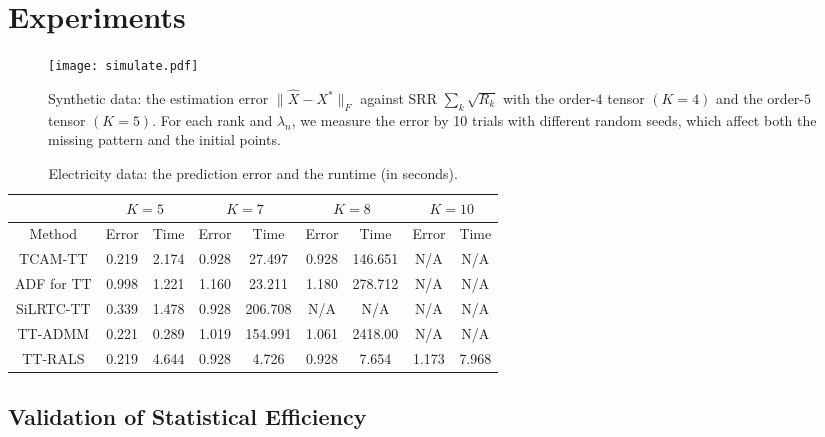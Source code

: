 \section{Experiments}
    \begin{figure}[htbp]
            \begin{center}
                \texttt{[image: simulate.pdf]}
            \end{center}
            \caption{Synthetic data: the estimation error
              $\|\hat{X} - X^*\|_F$ against SRR $\sum_k \sqrt{R_k}$
              with the order-$4$ tensor $(K=4)$ and the order-$5$
              tensor $(K=5)$. For each rank and $\lambda_n$, we
              measure the error by 10
              trials with different random seeds, which affect both
              the missing pattern and the initial
              points. \label{fig:validation}}
    \end{figure}

        \begin{table}
          \caption{Electricity data: the prediction error and the runtime (in seconds). \label{fig:elec}}
\begin{center}
        	\begin{tabular}{c|cc|cc|cc|cc}
				        	& \multicolumn{2}{|c|}{$K=5$} 		& \multicolumn{2}{|c}{$K=7$} 		& \multicolumn{2}{|c}{$K=8$} 		& \multicolumn{2}{|c}{$K=10$} 		\\ \hline
				Method    & 	Error		& 		Time		& 		Error	& 		Time		& 		Error	& 		Time		& 		Error	& 		Time		\\ \hline
				TCAM-TT &		0.219		&		2.174		&		0.928	&		27.497		&		0.928	&		146.651		&		N/A		&		N/A			\\
				ADF for TT &	0.998		&		1.221		&		1.160	&		23.211		&		1.180	&		278.712		&		N/A		&		N/A			\\
				SiLRTC-TT &		0.339		&		1.478		&		0.928	&		206.708		&		N/A		&		N/A			&		N/A		&		N/A			\\
				TT-ADMM &		0.221		&		0.289		&		1.019	&		154.991		&		1.061	&		2418.00		&		N/A		&		N/A  		\\
				TT-RALS &		0.219		&		4.644		&		0.928	&		4.726		&		0.928	&		7.654		&		1.173	&		7.968				
        	\end{tabular}        
\end{center}
        \end{table}


\subsection{Validation of Statistical Efficiency}

